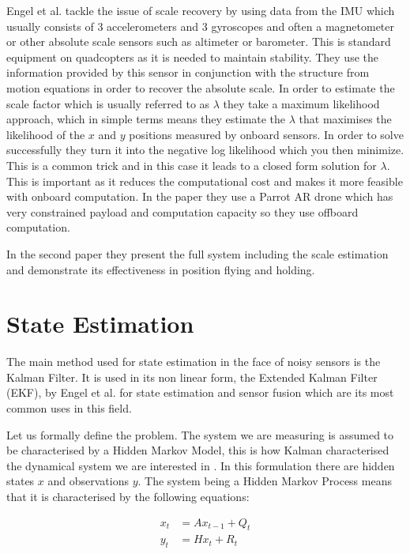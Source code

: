 \documentclass[]{../resources/final_report}
\begin{document}
Engel et al. tackle the issue of scale recovery by using data from the IMU which usually consists of 3 accelerometers and 3 gyroscopes and often a magnetometer or other absolute scale sensors such as altimeter or barometer. This is standard equipment on quadcopters as it is needed to maintain stability. They use the information provided by this sensor in conjunction with the structure from motion equations in order to recover the absolute scale. In order to estimate the scale factor which is usually referred to as $\lambda$ they take a maximum likelihood approach, which in simple terms means they estimate the $\lambda$ that maximises the likelihood of the $x$ and $y$ positions measured by onboard sensors. In order to solve successfully they turn it into the negative log likelihood which you then minimize. This is a common trick and in this case it leads to a closed form solution for $\lambda$. This is important as it reduces the computational cost and makes it more feasible with onboard computation. In the paper they use a Parrot AR drone which has very constrained payload and computation capacity so they use offboard computation.

In the second paper \cite{Engel:FigureFlying} they present the full system including the scale estimation and demonstrate its effectiveness in position flying and holding.


\section{State Estimation}

The main method used for state estimation in the face of noisy sensors is the Kalman Filter. It is used in its non linear form, the Extended Kalman Filter (EKF), by Engel et al.\cite{Engel:Camera-basedNav} for state estimation and sensor fusion which are its most common uses in this field.

Let us formally define the problem. The system we are measuring is assumed to be characterised by a Hidden Markov Model, this is how Kalman characterised the dynamical system we are interested in \cite{Kalman1960ANA}. In this formulation there are hidden states $x$ and observations $y$. The system being a Hidden Markov Process means that it is characterised by the following equations:

\begin{align}
  x_t &= Ax_{t-1} + Q_t \\
  y_t &= Hx_t + R_t
\end{align}
\end{document}
